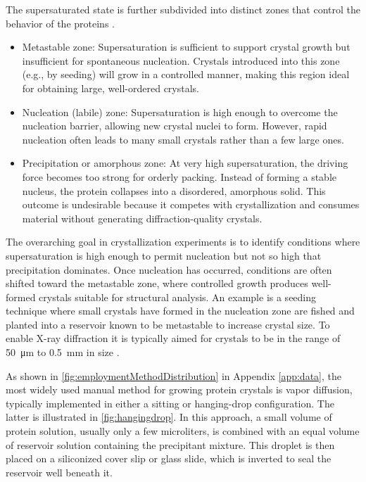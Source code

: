 The supersaturated state is further subdivided into distinct zones that control the behavior of the proteins \parencite{Bijelic2018}. 

\begin{itemize}
	\itemsep0em
	\item Metastable zone: Supersaturation is sufficient to support crystal growth but insufficient for spontaneous nucleation. Crystals introduced into this zone (e.g., by seeding) will grow in a controlled manner, making this region ideal for obtaining large, well-ordered crystals.
	\item Nucleation (labile) zone: Supersaturation is high enough to overcome the nucleation barrier, allowing new crystal nuclei to form. However, rapid nucleation often leads to many small crystals rather than a few large ones.
	\item Precipitation or amorphous zone: At very high supersaturation, the driving force becomes too strong for orderly packing. Instead of forming a stable nucleus, the protein collapses into a disordered, amorphous solid. This outcome is undesirable because it competes with crystallization and consumes material without generating diffraction-quality crystals.
\end{itemize}


The overarching goal in crystallization experiments is to identify conditions where supersaturation is high enough to permit nucleation but not so high that precipitation dominates. Once nucleation has occurred, conditions are often shifted toward the metastable zone, where controlled growth produces well-formed crystals suitable for structural analysis. An example is a seeding technique where small crystals have formed in the nucleation zone are fished and planted into a reservoir known to be metastable to increase crystal size. To enable X-ray diffraction it is typically aimed for crystals to be in the range of \qty{50}{\micro\metre} to \qty{0.5}{\milli\metre} in size \parencite{Rupp2009}. 

As shown in \autoref{fig:employmentMethodDistribution} in Appendix \ref{app:data}, the most widely used manual method for growing protein crystals is vapor diffusion, typically implemented in either a sitting or hanging-drop configuration. The latter is illustrated in \autoref{fig:hangingdrop}. In this approach, a small volume of protein solution, usually only a few microliters, is combined with an equal volume of reservoir solution containing the precipitant mixture. This droplet is then placed on a siliconized cover slip or glass slide, which is inverted to seal the reservoir well beneath it.

